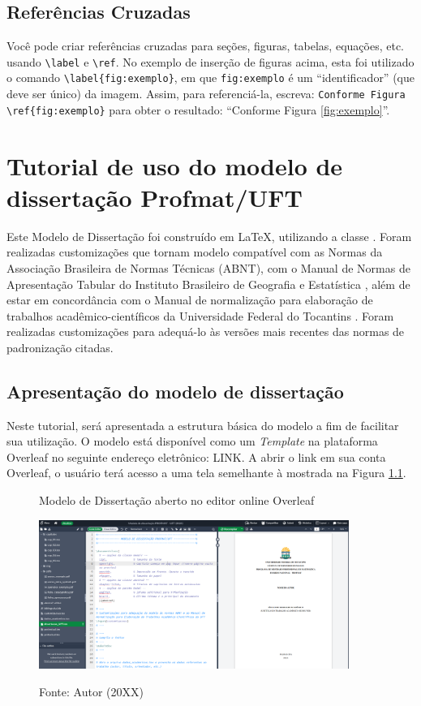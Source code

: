 \begin{apendicesenv}
\section*{Referências Cruzadas}

Você pode criar referências cruzadas para seções, figuras, tabelas, equações, etc. usando \texttt{\textbackslash label} e \texttt{\textbackslash ref}. No exemplo de inserção de figuras acima, esta foi utilizado o comando \verb|\label{fig:exemplo}|, em que \verb|fig:exemplo| é um ``identificador'' (que deve ser único) da imagem. Assim, para referenciá-la, escreva: \verb|Conforme Figura \ref{fig:exemplo}| para obter o resultado: ``Conforme Figura \ref{fig:exemplo}''.


\chapter{Tutorial de uso do modelo de dissertação Profmat/UFT}

Este Modelo de Dissertação foi construído em \LaTeX , utilizando a classe \abnTeX. Foram realizadas customizações que tornam modelo compatível com as Normas da Associação Brasileira de Normas Técnicas (ABNT), com o Manual de Normas de Apresentação Tabular do Instituto Brasileiro de Geografia e Estatística \cite{ManualIBGE}, além de estar em concordância com o Manual de normalização para elaboração de trabalhos acadêmico-científicos da Universidade Federal do Tocantins \cite{ManualUFT}. Foram realizadas customizações para adequá-lo às versões mais recentes das normas de padronização citadas.

\section*{Apresentação do modelo de dissertação}

Neste tutorial, será apresentada a estrutura básica do modelo a fim de facilitar sua utilização. O modelo está disponível como um \textit{Template} na plataforma Overleaf no seguinte endereço eletrônico: LINK. A abrir o link em sua conta Overleaf, o usuário terá acesso a uma tela semelhante à mostrada na  Figura \ref{fig:estrutura}.

\begin{figure}[H]
    \centering
    \caption{Modelo de Dissertação aberto no editor online Overleaf}
    \includegraphics[width=0.9\textwidth]{img/modelo/estrutura_arquivos.png}
    \\
    \caption*{\small{Fonte: Autor (20XX)}}
    \label{fig:estrutura}
\end{figure}


\end{apendicesenv}
